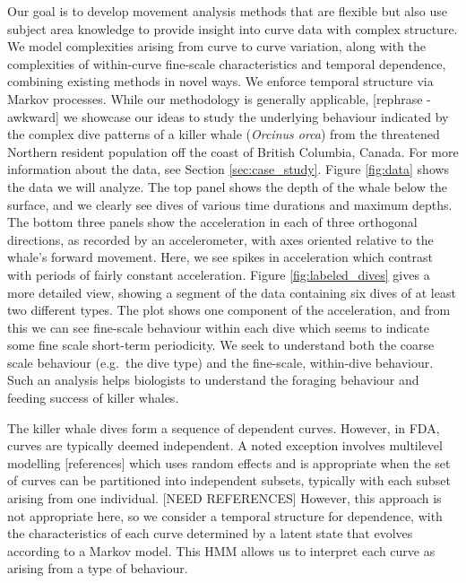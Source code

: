 Our goal is to develop movement analysis methods that are flexible but also use subject area knowledge to provide insight into curve data with complex structure.
We  model complexities arising  from curve to curve variation, along with the complexities of within-curve fine-scale characteristics and temporal dependence,
combining existing methods in novel ways.
We enforce temporal structure via Markov processes.  
While our methodology is generally applicable, [rephrase - awkward] we  showcase our ideas to study the underlying behaviour indicated by the complex dive patterns of a killer whale (\textit{Orcinus orca}) from the threatened Northern resident population off the coast of British Columbia, Canada.  
For more information about the data, see Section \ref{sec:case_study}.
Figure \ref{fig:data} shows the data we will analyze.
The top panel shows the depth of the whale below the surface, and we clearly see dives of various time durations and maximum depths. 
The bottom three panels show the acceleration in each of three orthogonal directions, as recorded by an accelerometer,   
with axes oriented relative to the whale's forward movement.
Here, we see spikes in acceleration which contrast with periods of fairly constant acceleration.
Figure {\ref{fig:labeled_dives}} gives a more detailed view, showing a segment of the data containing six dives of at least two different types.
The plot shows one component of the acceleration, and from this we can see fine-scale behaviour within each dive which seems to indicate some fine scale short-term periodicity. 
We seek to understand both the coarse scale behaviour (e.g.~the dive type) and the fine-scale, within-dive behaviour. 
Such an analysis helps biologists to understand the foraging behaviour and feeding success of killer whales. 

The killer whale dives form a sequence of dependent curves. However, in FDA, curves are typically deemed independent.  
A noted exception involves multilevel modelling [references] which uses random effects and is appropriate when the set of curves can be partitioned into independent subsets, typically with each subset arising from one individual.  
[NEED REFERENCES]  
However, this approach is not appropriate here, so we consider a temporal structure for dependence, with the characteristics of each curve determined by a latent state that evolves according to a Markov model.  
This HMM allows us to interpret each curve as arising from a type of behaviour.

